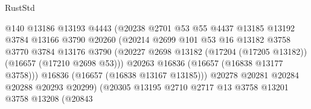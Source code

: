 \begin{lexlean}{RustStd}
\begin{coremodule}
                                        @140
                                        @13186
                                        @13193
                                        @4443
                                        (@20238
                                          @2701
                                          @53
                                          @55
                                          @4437
                                          @13185
                                          @13192
                                          @3784
                                          @13166
                                          @3790
                                          @20260
                                          (@20214
                                            @2699
                                            @101
                                            @53
                                            @16
                                            @13182
                                            @3758
                                            @3770
                                            @3784
                                            @13176
                                            @3790
                                            (@20227
                                              @2698
                                              @13182
                                              (@17204 (@17205 @13182))
                                              (@16657 (@17210 @2698 @53)))
                                            @20263
                                            @16836
                                            (@16657 (@16838 @13177 @3758)))
                                          @16836
                                          (@16657 (@16838 @13167 @13185)))
                                        @20278
                                        @20281
                                        @20284
                                        @20288
                                        @20293
                                        @20299)
                                      (@20305
                                        @13195
                                        @2710
                                        @2717
                                        @13
                                        @3758
                                        @13201
                                        @3758
                                        @13208
                                        (@20843

\end{coremodule}
\end{lexlean}
